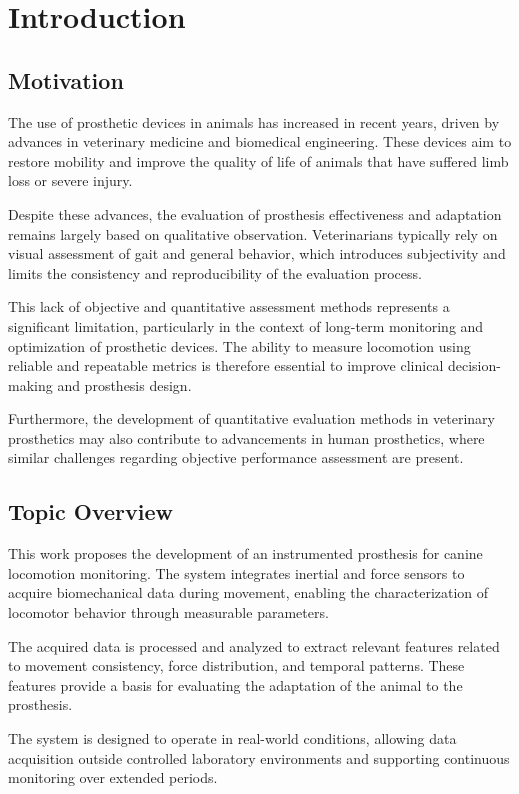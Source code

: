 \chapter{Introduction}

\section{Motivation}

The use of prosthetic devices in animals has increased in recent years, driven by advances in veterinary medicine and biomedical engineering. These devices aim to restore mobility and improve the quality of life of animals that have suffered limb loss or severe injury.

Despite these advances, the evaluation of prosthesis effectiveness and adaptation remains largely based on qualitative observation. Veterinarians typically rely on visual assessment of gait and general behavior, which introduces subjectivity and limits the consistency and reproducibility of the evaluation process.

This lack of objective and quantitative assessment methods represents a significant limitation, particularly in the context of long-term monitoring and optimization of prosthetic devices. The ability to measure locomotion using reliable and repeatable metrics is therefore essential to improve clinical decision-making and prosthesis design.

Furthermore, the development of quantitative evaluation methods in veterinary prosthetics may also contribute to advancements in human prosthetics, where similar challenges regarding objective performance assessment are present.

\section{Topic Overview}

This work proposes the development of an instrumented prosthesis for canine locomotion monitoring. The system integrates inertial and force sensors to acquire biomechanical data during movement, enabling the characterization of locomotor behavior through measurable parameters.

The acquired data is processed and analyzed to extract relevant features related to movement consistency, force distribution, and temporal patterns. These features provide a basis for evaluating the adaptation of the animal to the prosthesis.

The system is designed to operate in real-world conditions, allowing data acquisition outside controlled laboratory environments and supporting continuous monitoring over extended periods.

